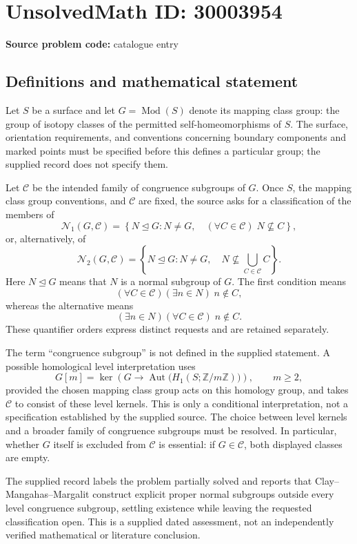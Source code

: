 \documentclass[11pt]{article}
\newcommand{\Z}{\mathbb{Z}}
\begin{document}
\section*{UnsolvedMath ID: 30003954}
\textbf{Source problem code:} catalogue entry
\subsection{Definitions and mathematical statement}
Let \(S\) be a surface and let \(G=\operatorname{Mod}(S)\) denote its mapping class group: the group of isotopy classes of the permitted self-homeomorphisms of \(S\). The surface, orientation requirements, and conventions concerning boundary components and marked points must be specified before this defines a particular group; the supplied record does not specify them.

Let \(\mathcal C\) be the intended family of congruence subgroups of \(G\). Once \(S\), the mapping class group conventions, and \(\mathcal C\) are fixed, the source asks for a classification of the members of
\[
\mathcal N_1(G,\mathcal C)=\left\{N\trianglelefteq G: N\ne G,\quad (\forall C\in\mathcal C)\;N\nsubseteq C\right\},
\]
or, alternatively, of
\[
\mathcal N_2(G,\mathcal C)=\left\{N\trianglelefteq G: N\ne G,\quad N\nsubseteq\bigcup_{C\in\mathcal C}C\right\}.
\]
Here \(N\trianglelefteq G\) means that \(N\) is a normal subgroup of \(G\). The first condition means
\[
(\forall C\in\mathcal C)(\exists n\in N)\;n\notin C,
\]
whereas the alternative means
\[
(\exists n\in N)(\forall C\in\mathcal C)\;n\notin C.
\]
These quantifier orders express distinct requests and are retained separately.

The term ``congruence subgroup'' is not defined in the supplied statement. A possible homological level interpretation uses
\[
G[m]=\ker\!\left(G\longrightarrow\operatorname{Aut}\bigl(H_1(S;\Z/m\Z)\bigr)\right),\qquad m\ge2,
\]
provided the chosen mapping class group acts on this homology group, and takes \(\mathcal C\) to consist of these level kernels. This is only a conditional interpretation, not a specification established by the supplied source. The choice between level kernels and a broader family of congruence subgroups must be resolved. In particular, whether \(G\) itself is excluded from \(\mathcal C\) is essential: if \(G\in\mathcal C\), both displayed classes are empty.

The supplied record labels the problem partially solved and reports that Clay--Mangahas--Margalit construct explicit proper normal subgroups outside every level congruence subgroup, settling existence while leaving the requested classification open. This is a supplied dated assessment, not an independently verified mathematical or literature conclusion.
\end{document}
